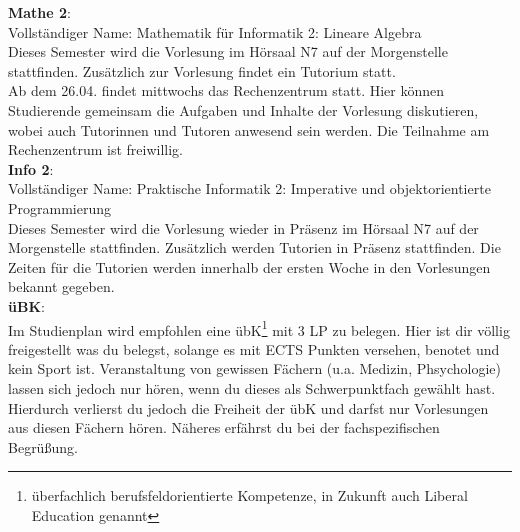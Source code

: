 \textbf{Mathe 2}:\\
Vollständiger Name: Mathematik für Informatik 2: Lineare Algebra\\
Dieses Semester wird die Vorlesung im Hörsaal N7 auf der Morgenstelle stattfinden.
Zusätzlich zur Vorlesung findet ein Tutorium statt. \\
Ab dem 26.04. findet mittwochs das Rechenzentrum statt. Hier können Studierende gemeinsam die Aufgaben und Inhalte der Vorlesung diskutieren,
wobei auch Tutorinnen und Tutoren anwesend sein werden. Die Teilnahme am Rechenzentrum ist freiwillig.\\

\textbf{Info 2}:\\
Vollständiger Name: Praktische Informatik 2: Imperative und objektorientierte Programmierung\\
Dieses Semester wird die Vorlesung wieder in Präsenz im Hörsaal N7 auf der Morgenstelle stattfinden.
Zusätzlich werden Tutorien in Präsenz stattfinden.
Die Zeiten für die Tutorien werden innerhalb der ersten Woche in den Vorlesungen bekannt gegeben.\\

\textbf{üBK}:\\
Im Studienplan wird empfohlen eine übK\footnote{überfachlich berufsfeldorientierte Kompetenze, in Zukunft auch Liberal Education genannt}
mit 3 LP zu belegen. Hier ist dir völlig freigestellt was du belegst, solange es mit ECTS Punkten versehen, benotet und kein Sport ist.
Veranstaltung von gewissen Fächern (u.a. Medizin, Phsychologie) lassen sich jedoch nur hören, wenn du dieses als Schwerpunktfach gewählt hast.
Hierdurch verlierst du jedoch die Freiheit der übK und darfst nur Vorlesungen aus diesen Fächern hören. Näheres erfährst du bei der fachspezifischen Begrüßung.

